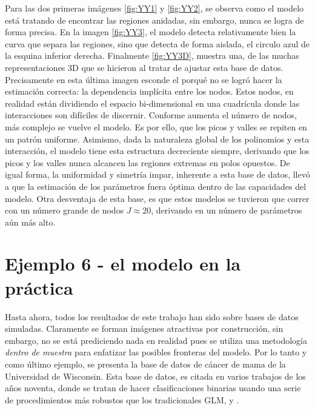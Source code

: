 \documentclass[../Main/Main.tex]{subfiles}
\begin{document}
Para las dos primeras imágenes \ref{fig:YY1} y \ref{fig:YY2}, se observa como el modelo está tratando de encontrar las regiones anidadas, sin embargo, nunca se logra de forma precisa. En la imagen \ref{fig:YY3}, el modelo detecta relativamente bien la curva que separa las regiones, sino que detecta de forma aislada, el circulo azul de la esquina inferior derecha. Finalmente \ref{fig:YY3D}, muestra una, de las muchas representaciones 3D que se hicieron al tratar de ajustar esta base de datos. Precisamente en esta última imagen esconde el porqué no se logró hacer la estimación correcta: la dependencia implícita entre los nodos. Estos nodos, en realidad están dividiendo el espacio bi-dimensional en una cuadrícula donde las interacciones son difíciles de discernir. Conforme aumenta el número de nodos, más complejo se vuelve el modelo. Es por ello, que los picos y valles se repiten en un patrón uniforme. Asimismo, dada la naturaleza global de los polinomios y esta interacción, el modelo tiene esta estructura decreciente siempre, derivando que los picos y los valles nunca alcancen las regiones extremas en polos opuestos. De igual forma, la uniformidad y simetría impar, inherente a esta base de datos, llevó a que la estimación de los parámetros fuera óptima dentro de las capacidades del modelo. Otra desventaja de esta base, es que estos modelos se tuvieron que correr con un número grande de nodos $J \approx 20$, derivando en un número de parámetros aún más alto.

\section{Ejemplo 6 - el modelo en la práctica} \label{sec:T6}
Hasta ahora, todos los resultados de este trabajo han sido sobre bases de datos simuladas. Claramente  se forman imágenes atractivas por construcción, sin embargo, no se está prediciendo nada en realidad pues se utiliza una metodología \textit{dentro de muestra} para enfatizar las posibles fronteras del modelo. Por lo tanto y como último ejemplo, se presenta la base de datos de cáncer de mama de la Universidad de Wisconsin. Esta base de datos, es citada en varios trabajos de los años noventa, donde se tratan de hacer clasificaciones binarias usando una serie de procedimientos más robustos que los tradicionales GLM,  \citet{mangasarian1990pattern} y \citet{bennett1992robust}.
\end{document}
